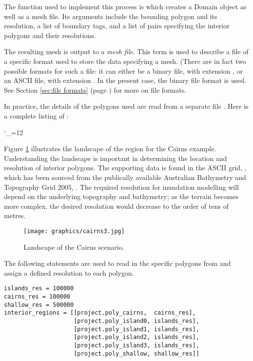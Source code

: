 \documentclass{manual}
\newcommand{\verbatiminputB}[1]{%
\endgroup}
\def\verbatiminputunderscore{\begingroup
\catcode`\_=12
\verbatiminputB}
\begin{document}
The function used to implement this process is
 which creates a Domain object as
well as a mesh file.  Its arguments include the
bounding polygon and its resolution, a list of boundary tags, and a
list of pairs  specifying the interior
polygons and their resolutions.

The resulting mesh is output to a \emph{mesh file}\label{def:mesh file}. This term is used to describe a file of
a specific format used to store the data specifying a mesh. (There
are in fact two possible formats for such a file: it can either be a
binary file, with extension , or an ASCII file, with
extension . In the present case, the binary file format
 is used. See Section \ref{sec:file formats} (page
\pageref{sec:file formats}) for more on file formats.

In practice, the details of the polygons used are read from a
separate file . Here is a complete listing of
:

\verbatiminputunderscore{../../anuga_core/examples/cairns/project.py}

Figure \ref{fig:cairns3d} illustrates the landscape of the region
for the Cairns example. Understanding the landscape is important in
determining the location and resolution of interior polygons. The
supporting data is found in the ASCII grid, , which
has been sourced from the publically available Australian Bathymetry
and Topography Grid 2005, \cite{grid250}. The required resolution
for inundation modelling will depend on the underlying topography and
bathymetry; as the terrain becomes more complex, the desired resolution
would decrease to the order of tens of metres.

\clearpage

\begin{figure}[htp]
  \centerline{\texttt{[image: graphics/cairns3.jpg]}}
  \caption{Landscape of the Cairns scenario.}
  \label{fig:cairns3d}
\end{figure}

The following statements are used to read in the specific polygons
from  and assign a defined resolution to
each polygon.

\begin{verbatim}
islands_res = 100000
cairns_res = 100000
shallow_res = 500000
interior_regions = [[project.poly_cairns,  cairns_res],
                    [project.poly_island0, islands_res],
                    [project.poly_island1, islands_res],
                    [project.poly_island2, islands_res],
                    [project.poly_island3, islands_res],
                    [project.poly_shallow, shallow_res]]
\end{verbatim}
\end{document}
